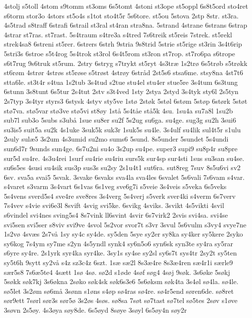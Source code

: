 {4stolj
s5toll
4stom
s9tomm
st3oms
6s5tomt
4stoni
st3ope
st5oppl
6s8t5ord
sto4ret
s6torm
stor3o
4stors
st5o4s
s1tot
sto4t5r
5s6tore.
st5ou
5stova
2stp
8str.
st3ra.
4s5trad
s8traff
6strafi
6strail
st3ral
st4ran
stra8na.
5strand
4strane
6strans
6strap
4strar
st7ras.
st7rast.
5s4traum
s4tre3a
s4tred
7s6treik
st5reis
7strek.
st5rekl
strek4sa8
6streni
st5rer.
6strers
6strh
9stria
9s8trid
5strie
st5rige
st3rin
3s4t6rip
5stri3s
6stroe
s5t4rog
5s4trok
st3rol
6s4t5rom
st3ron
st7rop.
st7ro6pa
s6trope
s6t7rug
9s6truk
st5rum.
2stry
6stryg
s7trykt
st5ryt
4s3træ
1s2trø
6s5trøb
s5trøkk
st6røm
4strør
4strøs
st5røse
s5trøst
4strøy
6stråd
2st5s6
stsa6me.
stsy8na
4st7t6
stta6le.
st3t4r
s4tua
1s2tub
3s4tud
s2tue
stu4el
stu4er
stue5re
3s4tum
6s3tung
6stunn
3s8tunt
6s5tur
2s4tut
2stv
s3t4ved
1sty
2stya
2styd
3s4tyk
sty6l
2s5tyn
2s7typ
3s4tyr
styrs3
6stysk
4styv
sty5ve
1stø
2støk
5støl
6støm
5støp
6størk
5støt
stø7va.
stø5var
stø3ve
stø5vi
st8øy
1stå
5s4tåe
stå5k
4su.
1su4a
su7a8l
1su2b
sub7l
sub3o
5subs
s3ubå
1sue
su8er
su2f
5s2ug
su6ga.
su4ge.
sug3g
su2h
3sui6
su3is5
suit5a
su2k
4s1uke
3suk5k
suk3r
1suk5s
su4le.
3s4ulf
su4lik
sul4t5r
s1ulu
2suly
sulæ5
3s2um
4s3umid
su2mo
sums6
5sund.
8s5under
5sundet
5s4undi
sun6d7r
9sunds
sun4ge.
6s7u2ni
su4o
3s2up
su4pe.
super3
supi9
su8p4r
su8pre
sur5d
su4re.
4s3u4rei
1surf
su4rie
su4riu
surs5k
sur4sp
sur4sti
1sus
su3san
su4se.
su6s5es
4susi
su4sik
sus3p
sus3s
su2sy
2s1u4t1
sut6ra.
sut8reg
7suv
8s5u6vi
sv2
6sv.
sva5a
svai5
5svak.
3svake
6svaks
sva4la
sva4les
6svalet
5s6vali
7s6vam
s4var.
s4varet
s3varm
3s4vart
6s1vas
6s1veg
sve6g7i
s5veie
3s4veis
s5veka
6s5veks
5s4vens
sverd5s4
sve4re
sve8res
3s4verg
5s4verj
s5verk
sver4ki
s4verm
6s7verv
7s4vev
s4vie
svi6e3l
8svift
4svig
svi5ke.
6svikg
4sviks.
3svikt
4s5vikti
4svil
s6vindel
svi4nes
sving5s4
8s7vink
ll6svint
4svir
6s7virk2
2svis
svi4sa.
svi4se
svi5sen
svi5ser
s8viv
svi9ve
4svol
5s2vor
svor7t
s3vr
3svul
5s6vulm
s3vy4
svye7ne
1s2vø
4svæs
2s7vå
1sy
sy4c
sy4de.
sy5den
5sye
sy2er
sy8ka
sy4ker
sy5kere
2syko
sy6kog
7s4ym
sy7me
s2yn
4s5yndl
synk4
sy6n5o6
syn6sk
syn3te
sy4ra
sy5rar
s6yre
sy4re.
2s1yrk
syr4ka
syr4ke.
3sy1s
sy4se
sy2sl
sy6s7t
sys4tr
2sy2t
sy5ten
sy5t6h
9sytt
sy2vå
s4z
sz3c4z
6szt.
1sæ
sæ2l
8s3æ4re
8s3æ4ren
sæ4r1i
særle9
sær5s8
7s6æ5te4
4sætt
1sø
4sø.
sø2d
s1øde
4søf
søg4
4søj
9søk.
3s6øke
5søkj
5søkk
søk7kj
3s6økna
2søko
søk4sk
søk6s3e6
5s6øksm
søk4ta
3s4øl
sø4la.
sø4le.
sø5let
3s2øm
sø6må
3sønn
s1øns
s4øp
sø4ras
sø4re.
sø4r5end
søren6de.
sø8ret
sør9ett
7sørl
sør3s
sør5ø
3s2øs
4søs.
sø8sa
7søt
sø7tast
sø7tel
sø5tes
2søv
s1øve
3søvn
2s5øy.
4s3øya
søy8de.
6s5øyd
8søye
3søyl
6s5øy4n
søy2r
}
